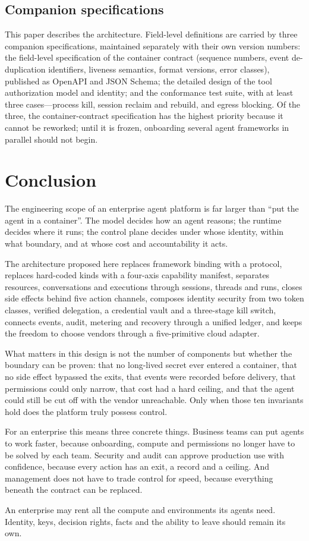 \subsection{Companion specifications}

This paper describes the architecture. Field-level definitions are carried by three companion specifications, maintained separately with their own version numbers: the field-level specification of the container contract (sequence numbers, event de-duplication identifiers, liveness semantics, format versions, error classes), published as OpenAPI and JSON Schema; the detailed design of the tool authorization model and identity; and the conformance test suite, with at least three cases---process kill, session reclaim and rebuild, and egress blocking. Of the three, the container-contract specification has the highest priority because it cannot be reworked; until it is frozen, onboarding several agent frameworks in parallel should not begin.

\section{Conclusion}
\label{sec:conclusion}

The engineering scope of an enterprise agent platform is far larger than ``put the agent in a container''. The model decides how an agent reasons; the runtime decides where it runs; the control plane decides under whose identity, within what boundary, and at whose cost and accountability it acts.

The architecture proposed here replaces framework binding with a protocol, replaces hard-coded kinds with a four-axis capability manifest, separates resources, conversations and executions through sessions, threads and runs, closes side effects behind five action channels, composes identity security from two token classes, verified delegation, a credential vault and a three-stage kill switch, connects events, audit, metering and recovery through a unified ledger, and keeps the freedom to choose vendors through a five-primitive cloud adapter.

What matters in this design is not the number of components but whether the boundary can be proven: that no long-lived secret ever entered a container, that no side effect bypassed the exits, that events were recorded before delivery, that permissions could only narrow, that cost had a hard ceiling, and that the agent could still be cut off with the vendor unreachable. Only when those ten invariants hold does the platform truly possess control.

For an enterprise this means three concrete things. Business teams can put agents to work faster, because onboarding, compute and permissions no longer have to be solved by each team. Security and audit can approve production use with confidence, because every action has an exit, a record and a ceiling. And management does not have to trade control for speed, because everything beneath the contract can be replaced.

An enterprise may rent all the compute and environments its agents need. Identity, keys, decision rights, facts and the ability to leave should remain its own.
